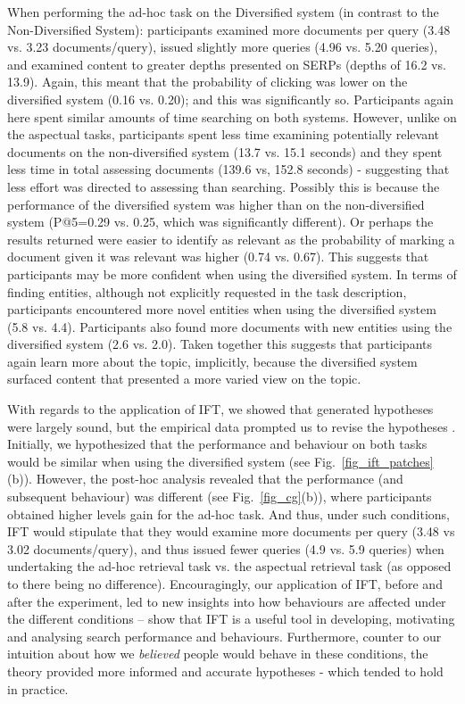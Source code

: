 When performing the ad-hoc task on the Diversified system (in contrast to the Non-Diversified System): participants examined more documents per query (3.48 vs. 3.23 documents/query), issued slightly more queries (4.96 vs. 5.20 queries), and examined content to greater depths presented on SERPs (depths of 16.2 vs. 13.9). Again, this meant that the probability of clicking was lower on the diversified system (0.16 vs. 0.20); and this was significantly so. Participants again here spent similar amounts of time searching on both systems. However, unlike on the aspectual tasks, participants spent less time examining potentially relevant documents on the non-diversified system (13.7 vs. 15.1 seconds) and they spent less time in total assessing documents (139.6 vs, 152.8 seconds) - suggesting that less effort was directed to assessing than searching. Possibly this is because the performance of the diversified system was higher than on the non-diversified system (P@5=0.29 vs. 0.25, which was significantly different). Or perhaps the results returned were easier to identify as relevant as the probability of marking a document given it was relevant was higher (0.74 vs. 0.67). This suggests that participants may be more confident when using the diversified system. In terms of finding entities, although not explicitly requested in the task description, participants encountered more novel entities when using the diversified system (5.8 vs. 4.4). Participants also found more documents with new entities using the diversified system (2.6 vs. 2.0). Taken together this suggests that participants again learn more about the topic, implicitly, because the diversified system surfaced content that presented a more varied view on the topic.


With regards to the application of IFT, we showed that generated hypotheses were largely sound, but the empirical data prompted us to revise the hypotheses . Initially, we hypothesized that the performance and behaviour on both tasks would be similar  when using the diversified system (see Fig.~\ref{fig_ift_patches}(b)). However, the post-hoc analysis revealed that the performance (and subsequent behaviour) was different (see Fig.~\ref{fig_cg}(b)), where participants obtained higher levels gain for the ad-hoc task. And thus, under such conditions, IFT would stipulate that they would examine more documents per query (3.48 vs 3.02 documents/query), and thus issued fewer queries (4.9 vs. 5.9 queries) when undertaking the ad-hoc retrieval task vs. the aspectual retrieval task (as opposed to there being no difference). Encouragingly, our application of IFT, before and after the experiment, led to new insights into how behaviours are affected under the different conditions -- show that IFT is a useful tool in developing, motivating and analysing search performance and behaviours. Furthermore, counter to our intuition about how we \emph{believed} people would behave in these conditions, the theory provided more informed and accurate hypotheses - which tended to hold in practice.



